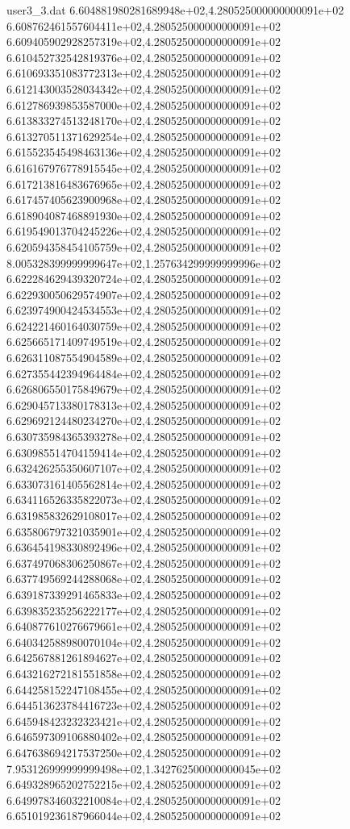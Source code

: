 \begin{filecontents}{user3_3.dat}
6.604881980281689948e+02,4.280525000000000091e+02
6.608762461557604411e+02,4.280525000000000091e+02
6.609405902928257319e+02,4.280525000000000091e+02
6.610452732542819376e+02,4.280525000000000091e+02
6.610693351083772313e+02,4.280525000000000091e+02
6.612143003528034342e+02,4.280525000000000091e+02
6.612786939853587000e+02,4.280525000000000091e+02
6.613833274513248170e+02,4.280525000000000091e+02
6.613270511371629254e+02,4.280525000000000091e+02
6.615523545498463136e+02,4.280525000000000091e+02
6.616167976778915545e+02,4.280525000000000091e+02
6.617213816483676965e+02,4.280525000000000091e+02
6.617457405623900968e+02,4.280525000000000091e+02
6.618904087468891930e+02,4.280525000000000091e+02
6.619549013704245226e+02,4.280525000000000091e+02
6.620594358454105759e+02,4.280525000000000091e+02
8.005328399999999647e+02,1.257634299999999996e+02
6.622284629439320724e+02,4.280525000000000091e+02
6.622930050629574907e+02,4.280525000000000091e+02
6.623974900424534553e+02,4.280525000000000091e+02
6.624221460164030759e+02,4.280525000000000091e+02
6.625665171409749519e+02,4.280525000000000091e+02
6.626311087554904589e+02,4.280525000000000091e+02
6.627355442394964484e+02,4.280525000000000091e+02
6.626806550175849679e+02,4.280525000000000091e+02
6.629045713380178313e+02,4.280525000000000091e+02
6.629692124480234270e+02,4.280525000000000091e+02
6.630735984365393278e+02,4.280525000000000091e+02
6.630985514704159414e+02,4.280525000000000091e+02
6.632426255350607107e+02,4.280525000000000091e+02
6.633073161405562814e+02,4.280525000000000091e+02
6.634116526335822073e+02,4.280525000000000091e+02
6.631985832629108017e+02,4.280525000000000091e+02
6.635806797321035901e+02,4.280525000000000091e+02
6.636454198330892496e+02,4.280525000000000091e+02
6.637497068306250867e+02,4.280525000000000091e+02
6.637749569244288068e+02,4.280525000000000091e+02
6.639187339291465833e+02,4.280525000000000091e+02
6.639835235256222177e+02,4.280525000000000091e+02
6.640877610276679661e+02,4.280525000000000091e+02
6.640342588980070104e+02,4.280525000000000091e+02
6.642567881261894627e+02,4.280525000000000091e+02
6.643216272181551858e+02,4.280525000000000091e+02
6.644258152247108455e+02,4.280525000000000091e+02
6.644513623784416723e+02,4.280525000000000091e+02
6.645948423232323421e+02,4.280525000000000091e+02
6.646597309106880402e+02,4.280525000000000091e+02
6.647638694217537250e+02,4.280525000000000091e+02
7.953126999999999498e+02,1.342762500000000045e+02
6.649328965202752215e+02,4.280525000000000091e+02
6.649978346032210084e+02,4.280525000000000091e+02
6.651019236187966044e+02,4.280525000000000091e+02

\end{filecontents}
